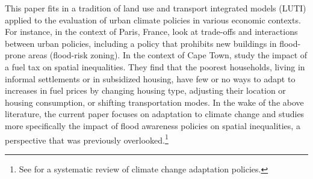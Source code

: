 \documentclass[12pt]{article}
\begin{document}
This paper fits in a tradition of land use and transport integrated models (LUTI) applied to the evaluation of urban climate policies in various economic contexts. For instance, in the context of Paris, France, \citet{Viguie2012Trade-offsPolicies} look at trade-offs and interactions between urban policies, including a policy that prohibits new buildings in flood-prone areas (flood-risk zoning). In the context of Cape Town, \citet{Liotta2024ClimateIncomes} study the impact of a fuel tax on spatial inequalities. They find that the poorest households, living in informal settlements or in subsidized housing, have few or no ways to adapt to increases in fuel prices by changing housing type, adjusting their location or housing consumption, or shifting transportation modes. In the wake of the above literature, the current paper focuses on adaptation to climate change and studies more specifically the impact of flood awareness policies on spatial inequalities, a perspective that was previously overlooked.\footnote{See \citet{carleton_chapter_2024} for a systematic review of climate change adaptation policies.}




\end{document}
